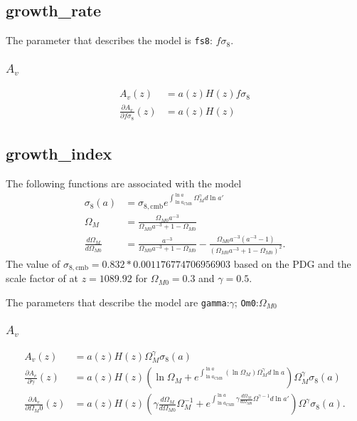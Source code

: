 \documentclass{article}
\begin{document}
\subsection{growth\_rate}

The parameter that describes the model is
{\tt fs8}: $f\sigma_8$.

\subsubsection{$A_v$}
\begin{align}
A_{v}(z) & = a(z) H(z) f\sigma_8 \\
\frac{\partial A_{v}}{\partial f\sigma_8} (z) & = a(z) H(z)
\end{align}

\subsection{growth\_index}
The following functions are associated with the model
\begin{align}
\sigma_8(a) & = \sigma_{8,\text{cmb}}  e^{\int^{\ln{a}}_{\ln{a_\text{CMB}}} \Omega_M^\gamma d\ln{a'}} \\
\Omega_M & = \frac{\Omega_{M0} a^{-3}}{\Omega_{M0} a^{-3} + 1 - \Omega_{M0}}\\
\frac{d\Omega_M}{d\Omega_{M0}} & = \frac{a^{-3}}{\Omega_{M0} a^{-3} + 1 - \Omega_{M0}} - \frac{\Omega_{M0} a^{-3}(a^{-3}-1)}{(\Omega_{M0} a^{-3} + 1 - \Omega_{M0})^2}.
\end{align}
The value of $ \sigma_{8,\text{cmb}}= 0.832 * 0.001176774706956903$ based on the PDG and the scale factor
of at $z=1089.92$ for $\Omega_{M0}=0.3$ and $\gamma=0.5$.

The parameters that describe the model are {\tt gamma}:$\gamma$; {\tt Om0}:$\Omega_{M0}$

\subsubsection{$A_v$}

\begin{align}
A_{v}(z) & =a(z) H(z) \Omega_M^\gamma  \sigma_8(a) \\
\frac{\partial A_{v}}{\partial \gamma} (z) & = a(z) H(z)
\left( \ln{\Omega_M}   + 
 e^{\int^{\ln{a}}_{\ln{a_\text{CMB}}}\left( \ln{\Omega_M} \right) \Omega_M^\gamma d\ln{a}}
\right) \Omega_M^\gamma  \sigma_8(a) \\
\frac{\partial A_{v}}{\partial \Omega_M0} (z) & =a(z)  H(z) 
\left( \gamma  \frac{d\Omega_M}{d\Omega_{M0}} \Omega_M^{-1}  + 
 e^{\int^{\ln{a}}_{\ln{a_\text{CMB}}}\gamma \frac{d\Omega_M}{d\Omega_{M0}} \Omega^{\gamma-1} d\ln{a'}}
\right) \Omega^\gamma  \sigma_8(a).
\end{align}
\end{document}
